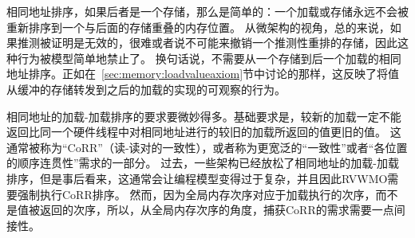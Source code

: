 相同地址排序，如果后者是一个存储，那么是简单的：一个加载或存储永远不会被重新排序到一个与后面的存储重叠的内存位置。
从微架构的视角，总的来说，如果推测被证明是无效的，很难或者说不可能来撤销一个推测性重排的存储，因此这种行为被模型简单地禁止了。
换句话说，不需要从一个存储到后一个加载的相同地址排序。正如在~\ref{sec:memory:loadvalueaxiom}节中讨论的那样，这反映了将值从缓冲的存储转发到之后的加载的实现的可观察的行为。

相同地址的加载-加载排序的要求要微妙得多。基础要求是，较新的加载一定不能返回比同一个硬件线程中对相同地址进行的较旧的加载所返回的值更旧的值。
这通常被称为“CoRR”（读-读对的一致性），或者称为更宽泛的“一致性”或者“各位置的顺序连贯性”需求的一部分。
过去，一些架构已经放松了相同地址的加载-加载排序，但是事后看来，这通常会让编程模型变得过于复杂，并且因此RVWMO需要强制执行CoRR排序。
然而，因为全局内存次序对应于加载执行的次序，而不是值被返回的次序，所以，从全局内存次序的角度，捕获CoRR的需求需要一点间接性。

